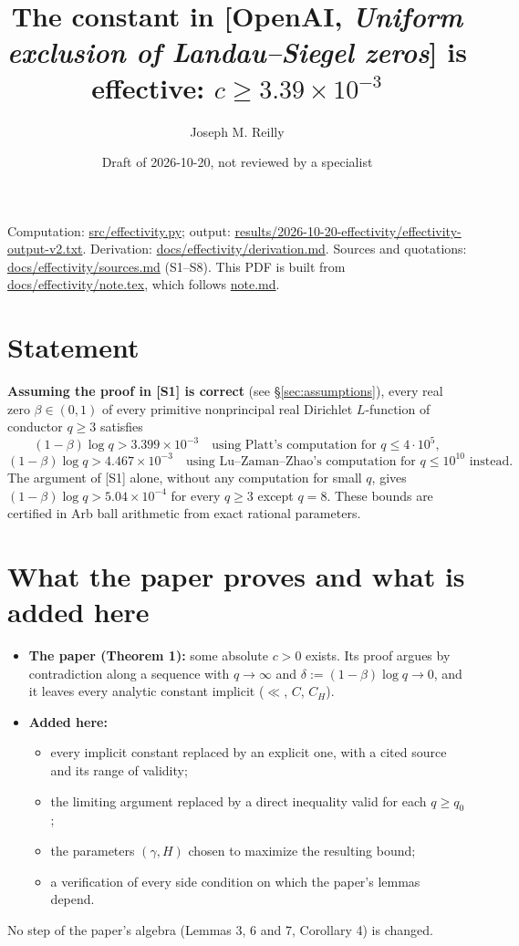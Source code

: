 \documentclass[11pt]{article}
\title{The constant in [OpenAI, \emph{Uniform exclusion of Landau--Siegel zeros}] is effective: $c \ge 3.39\times 10^{-3}$}
\author{Joseph M. Reilly}
\date{Draft of 2026-10-20, not reviewed by a specialist}
\begin{document}
\maketitle

\noindent Computation: \url{src/effectivity.py}; output: \url{results/2026-10-20-effectivity/effectivity-output-v2.txt}.
Derivation: \url{docs/effectivity/derivation.md}. Sources and quotations: \url{docs/effectivity/sources.md} (S1--S8).
This PDF is built from \url{docs/effectivity/note.tex}, which follows \url{note.md}.

\section{Statement}

\textbf{Assuming the proof in [S1] is correct} (see \S\ref{sec:assumptions}), every real zero $\beta\in(0,1)$ of every primitive nonprincipal real Dirichlet $L$-function of conductor $q\ge 3$ satisfies
\[
(1-\beta)\log q > 3.399\times 10^{-3}\quad\text{using Platt's computation for } q\le 4\cdot 10^5,
\]
\[
(1-\beta)\log q > 4.467\times 10^{-3}\quad\text{using Lu--Zaman--Zhao's computation for } q\le 10^{10} \text{ instead.}
\]
The argument of [S1] alone, without any computation for small $q$, gives $(1-\beta)\log q > 5.04\times 10^{-4}$ for every $q\ge 3$ except $q=8$.
These bounds are certified in Arb ball arithmetic from exact rational parameters.

\section{What the paper proves and what is added here}

\begin{itemize}
\item \textbf{The paper (Theorem 1):} some absolute $c>0$ exists. Its proof argues by contradiction along a sequence with $q\to\infty$ and $\delta := (1-\beta)\log q\to 0$, and it leaves every analytic constant implicit ($\ll$, $C$, $C_H$).
\item \textbf{Added here:}
  \begin{itemize}
  \item every implicit constant replaced by an explicit one, with a cited source and its range of validity;
  \item the limiting argument replaced by a direct inequality valid for each $q\ge q_0$;
  \item the parameters $(\gamma,H)$ chosen to maximize the resulting bound;
  \item a verification of every side condition on which the paper's lemmas depend.
  \end{itemize}
\end{itemize}
No step of the paper's algebra (Lemmas 3, 6 and 7, Corollary 4) is changed.
\end{document}
